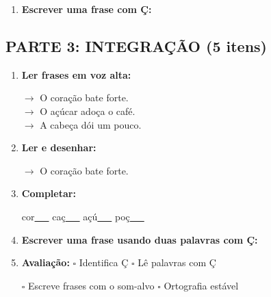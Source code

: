 \begin{exercicio}
\begin{enumerate}[resume]
  \item \textbf{Escrever uma frase com Ç:}
  \begin{center}
  \underline{\hspace{12cm}}
  \end{center}

\end{enumerate}

\subsection*{PARTE 3: INTEGRAÇÃO (5 itens)}

\begin{enumerate}[resume]

  \item \textbf{Ler frases em voz alta:}
  \begin{center}
  $\rightarrow$ O coração bate forte.\\
  $\rightarrow$ O açúcar adoça o café.\\
  $\rightarrow$ A cabeça dói um pouco.\\
  \end{center}

  \item \textbf{Ler e desenhar:}
  \begin{center}
  $\rightarrow$ O coração bate forte.
  \end{center}
  \begin{center}
  \end{center}

  \item \textbf{Completar:}
  \begin{center}
  cor\underline{~~~} \quad caç\underline{~~~} \quad açú\underline{~~~} \quad poç\underline{~~~}
  \end{center}

  \item \textbf{Escrever uma frase usando duas palavras com Ç:}
  \begin{center}
  \underline{\hspace{12cm}}
  \end{center}

  \item \textbf{Avaliação:} $\square$ Identifica Ç \quad $\square$ Lê palavras com Ç
  \begin{center}
  $\square$ Escreve frases com o som-alvo \quad $\square$ Ortografia estável
  \end{center}


\end{enumerate}
\end{exercicio}
